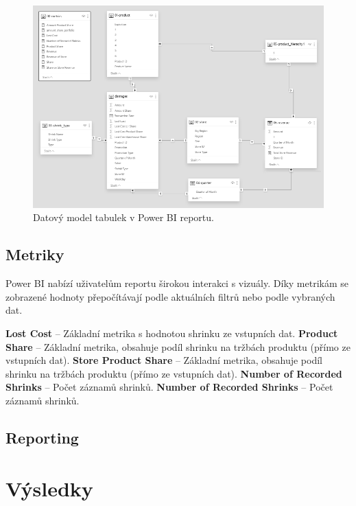 \begin{figure}[hbtp!]
    \centering
    \captionsetup{justification=centering}
    \includegraphics[width=\textwidth]{obrazky/PBI/datmodel.png}
    \caption{Datový model tabulek v Power BI reportu.}
    \label{obr:datmod}
\end{figure}

\subsection{Metriky}

Power BI nabízí uživatelům reportu širokou interakci s vizuály. Díky metrikám se zobrazené hodnoty přepočítávají podle aktuálních filtrů nebo podle vybraných dat. 

\textbf{Lost Cost} -- Základní metrika s hodnotou shrinku ze vstupních dat.
\textbf{Product Share} -- Základní metrika, obsahuje podíl shrinku na tržbách produktu (přímo ze vstupních dat).
\textbf{Store Product Share} -- Základní metrika, obsahuje podíl shrinku na tržbách produktu (přímo ze vstupních dat).
\textbf{Number of Recorded Shrinks} -- Počet záznamů shrinků.
\textbf{Number of Recorded Shrinks} -- Počet záznamů shrinků.


\subsection{Reporting}


\section{Výsledky}
\label{sec:vizualizace:vysl}

